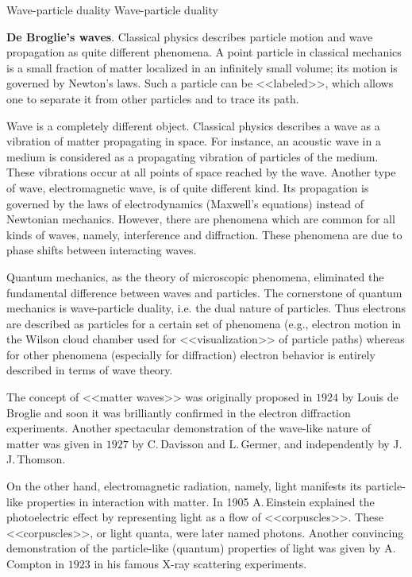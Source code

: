 
{Wave-particle duality}
{Wave-particle duality}

\textbf{De Broglie's waves}.
Classical physics describes particle motion and wave propagation as quite different phenomena. A point particle in classical mechanics is a small fraction of matter localized in an infinitely small volume; its motion is governed by Newton's laws. Such a particle can be <<labeled>>, which allows one to separate it from other particles and to trace its path.

Wave is a completely different object. Classical physics describes a wave as a vibration of matter propagating in space. For instance, an acoustic wave in a medium is considered as a propagating vibration of particles of the medium. These vibrations occur at all points of space reached by the wave. Another type of wave, electromagnetic wave, is of quite different kind. Its propagation is governed by the laws of electrodynamics (Maxwell's equations) instead of Newtonian mechanics. However, there are phenomena which are common for all kinds of waves, namely, interference and diffraction. These phenomena are due to phase shifts between interacting waves.

Quantum mechanics, as the theory of microscopic phenomena, eliminated the fundamental difference between waves and particles. The cornerstone of quantum mechanics is wave-particle duality, i.e. the dual nature of particles. Thus electrons are described as particles for a certain set of phenomena (e.g., electron motion in the Wilson cloud chamber used for <<visualization>> of particle paths) whereas for other phenomena (especially for diffraction) electron behavior is entirely described in terms of wave theory.

The concept of <<matter waves>> was originally proposed in $1924$ by Louis de Broglie and soon it was brilliantly confirmed in the electron diffraction experiments. Another spectacular demonstration of the wave-like nature of matter was given in $1927$ by C.\,Davisson and L.\,Germer, and independently by J.\,J.\,Thomson.

On the other hand, electromagnetic radiation, namely, light manifests its particle-like properties in interaction with matter. In 1905 A.\,Einstein explained the photoelectric effect by representing light as a flow of <<corpuscles>>. These <<corpuscles>>, or light quanta, were later named photons. Another convincing demonstration of the particle-like (quantum) properties of light was given by A.\,Compton in $1923$ in his famous X-ray scattering experiments.

